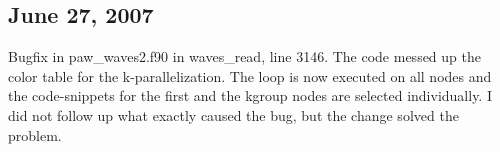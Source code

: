 \documentclass[final,12pt]{article}
\begin{document}
\subsection{June 27,  2007}

Bugfix in paw\_waves2.f90 in waves\_read, line 3146. The code messed up
the color table for the k-parallelization. The loop is now executed on
all nodes and the code-snippets for the first and the kgroup nodes are
selected individually. I did not follow up what exactly caused the
bug, but the change solved the problem.


\newpage


\end{document}
